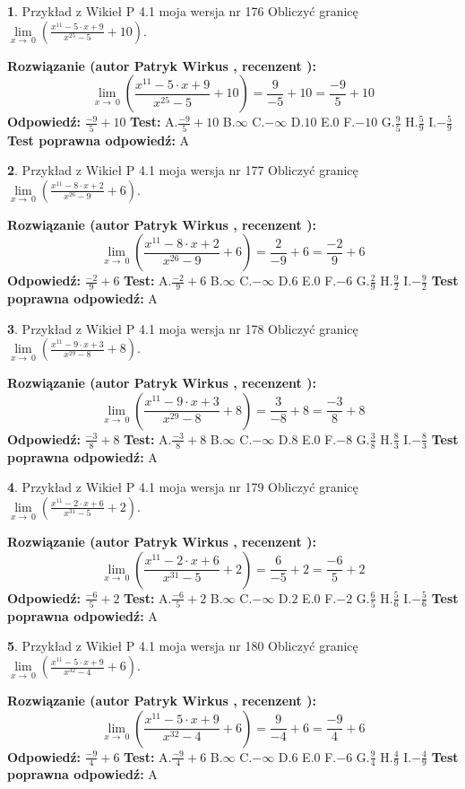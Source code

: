 \documentclass[12pt, a4paper]{article}
\theoremstyle{definition} %
\newtheorem{zad}{}
\newcommand{\zadStart}[1]{\begin{zad}#1\newline}
\newcommand{\zadStop}{\end{zad}}
\newcommand{\rozwStart}[2]{\noindent \textbf{Rozwiązanie (autor #1 , recenzent #2): }\newline}
\newcommand{\rozwStop}{\newline}
\newcommand{\odpStart}{\noindent \textbf{Odpowiedź:}\newline}
\newcommand{\odpStop}{\newline}
\newcommand{\testStart}{\noindent \textbf{Test:}\newline}
\newcommand{\testStop}{\newline}
\newcommand{\kluczStart}{\noindent \textbf{Test poprawna odpowiedź:}\newline}
\newcommand{\kluczStop}{\newline}
\begin{document}
\zadStart{Przykład z Wikieł P 4.1 moja wersja nr 176}
Obliczyć granicę $\lim\limits_{x\to\ 0}(\frac{x^{11}-5 \cdot x +9}{x^{25}-5}+10)$.
\zadStop
\rozwStart{Patryk Wirkus}{}
$$\lim\limits_{x\to\ 0}(\frac{x^{11}-5 \cdot x +9}{x^{25}-5}+10)=\frac{9}{-5}+10=\frac{-9}{5}+10$$
\rozwStop
\odpStart
$\frac{-9}{5}+10$
\odpStop
\testStart
A.$\frac{-9}{5}+10$
B.$\infty$
C.$-\infty$
D.$10$
E.$0$
F.$-10$
G.$\frac{9}{5}$
H.$\frac{5}{9}$
I.$-\frac{5}{9}$
\testStop
\kluczStart
A
\kluczStop



\zadStart{Przykład z Wikieł P 4.1 moja wersja nr 177}
Obliczyć granicę $\lim\limits_{x\to\ 0}(\frac{x^{11}-8 \cdot x +2}{x^{26}-9}+6)$.
\zadStop
\rozwStart{Patryk Wirkus}{}
$$\lim\limits_{x\to\ 0}(\frac{x^{11}-8 \cdot x +2}{x^{26}-9}+6)=\frac{2}{-9}+6=\frac{-2}{9}+6$$
\rozwStop
\odpStart
$\frac{-2}{9}+6$
\odpStop
\testStart
A.$\frac{-2}{9}+6$
B.$\infty$
C.$-\infty$
D.$6$
E.$0$
F.$-6$
G.$\frac{2}{9}$
H.$\frac{9}{2}$
I.$-\frac{9}{2}$
\testStop
\kluczStart
A
\kluczStop



\zadStart{Przykład z Wikieł P 4.1 moja wersja nr 178}
Obliczyć granicę $\lim\limits_{x\to\ 0}(\frac{x^{11}-9 \cdot x +3}{x^{29}-8}+8)$.
\zadStop
\rozwStart{Patryk Wirkus}{}
$$\lim\limits_{x\to\ 0}(\frac{x^{11}-9 \cdot x +3}{x^{29}-8}+8)=\frac{3}{-8}+8=\frac{-3}{8}+8$$
\rozwStop
\odpStart
$\frac{-3}{8}+8$
\odpStop
\testStart
A.$\frac{-3}{8}+8$
B.$\infty$
C.$-\infty$
D.$8$
E.$0$
F.$-8$
G.$\frac{3}{8}$
H.$\frac{8}{3}$
I.$-\frac{8}{3}$
\testStop
\kluczStart
A
\kluczStop



\zadStart{Przykład z Wikieł P 4.1 moja wersja nr 179}
Obliczyć granicę $\lim\limits_{x\to\ 0}(\frac{x^{11}-2 \cdot x +6}{x^{31}-5}+2)$.
\zadStop
\rozwStart{Patryk Wirkus}{}
$$\lim\limits_{x\to\ 0}(\frac{x^{11}-2 \cdot x +6}{x^{31}-5}+2)=\frac{6}{-5}+2=\frac{-6}{5}+2$$
\rozwStop
\odpStart
$\frac{-6}{5}+2$
\odpStop
\testStart
A.$\frac{-6}{5}+2$
B.$\infty$
C.$-\infty$
D.$2$
E.$0$
F.$-2$
G.$\frac{6}{5}$
H.$\frac{5}{6}$
I.$-\frac{5}{6}$
\testStop
\kluczStart
A
\kluczStop



\zadStart{Przykład z Wikieł P 4.1 moja wersja nr 180}
Obliczyć granicę $\lim\limits_{x\to\ 0}(\frac{x^{11}-5 \cdot x +9}{x^{32}-4}+6)$.
\zadStop
\rozwStart{Patryk Wirkus}{}
$$\lim\limits_{x\to\ 0}(\frac{x^{11}-5 \cdot x +9}{x^{32}-4}+6)=\frac{9}{-4}+6=\frac{-9}{4}+6$$
\rozwStop
\odpStart
$\frac{-9}{4}+6$
\odpStop
\testStart
A.$\frac{-9}{4}+6$
B.$\infty$
C.$-\infty$
D.$6$
E.$0$
F.$-6$
G.$\frac{9}{4}$
H.$\frac{4}{9}$
I.$-\frac{4}{9}$
\testStop
\kluczStart
A
\kluczStop
\end{document}
